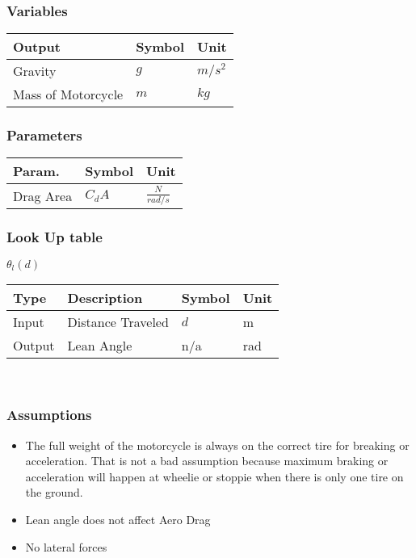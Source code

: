 \documentclass[../SimBALink.tex]{subfiles}
\begin{document}
\subsubsection{Variables}
	\begin{tabular}{ l | l | l  }
		Output					&	Symbol		&	Unit		\\	\hline
		Gravity 				&	$g$			&	$m/s^2$ \\
		Mass of Motorcycle		&	$m$			&  $kg$	
						
	\end{tabular}
\subsubsection{Parameters}
	\begin{tabular}{ l | l | l  }
		Param.					&	Symbol		&	Unit		\\	\hline
		Drag Area				&	$C_dA$		&	 $\frac{N}{rad/s}$ 			
	\end{tabular}
\subsubsection{Look Up table}
$\theta_l(d)$ \\
	\begin{tabular}{ l | l | l | l }
		Type				& Description		&	Symbol		&	Unit		\\	\hline
		Input 				& Distance Traveled	&	$d$  		& 	m		\\
		Output 				& Lean Angle		&	n/a			&	rad
	\end{tabular} \\

\subsubsection{Assumptions}
\begin{itemize}
    \item The full weight of the motorcycle is always on the correct tire for breaking or acceleration. That is not a bad assumption because maximum braking or acceleration will happen at wheelie or stoppie when there is only one tire on the ground.
    \item Lean angle does not affect Aero Drag
    \item No lateral forces
\end{itemize}
\end{document}
